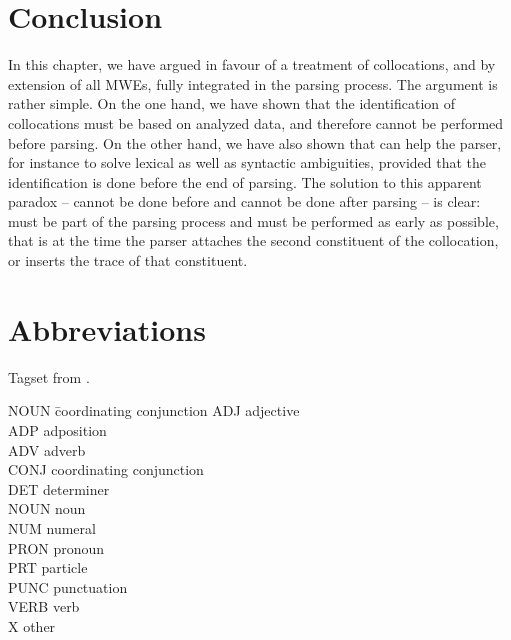 \documentclass[output=paper]{langsci/langscibook}
\begin{document}
\section{Conclusion}
\label{fou:sec7}
In this chapter, we have argued in favour of a treatment of collocations, and by extension of all MWEs, fully integrated in the parsing process. The argument is rather simple. On the one hand, we have shown that the identification of collocations must be based on analyzed data, and therefore cannot be performed before parsing. On the other hand, we have also shown that  can help the parser, for instance to solve lexical as well as syntactic ambiguities, provided that the identification is done before the end of parsing. The solution to this apparent paradox --  cannot be done before and cannot be done after parsing -- is clear:  must be part of the parsing process and must be performed as early as possible, that is at the time the parser attaches the second constituent of the collocation, or inserts the trace of that constituent. 

%
% 

\section*{Abbreviations}
Tagset from \cite{petrov12}.
\begin{multicols}{2}
\begin{tabbing}
NOUN \hspace{1em} \= coordinating conjunction\kill
    ADJ \> adjective \\
    ADP \> adposition \\
    ADV \> adverb \\
    CONJ \> coordinating conjunction \\
    DET \> determiner \\
    NOUN \> noun \\
    NUM \> numeral \\
    PRON \> pronoun \\
    PRT \> particle     \\
    PUNC \> punctuation \\
    VERB \> verb \\
    X \> other
\end{tabbing}
\end{multicols}

{\sloppy\printbibliography[heading=subbibliography,notkeyword=this]}
\end{document}
